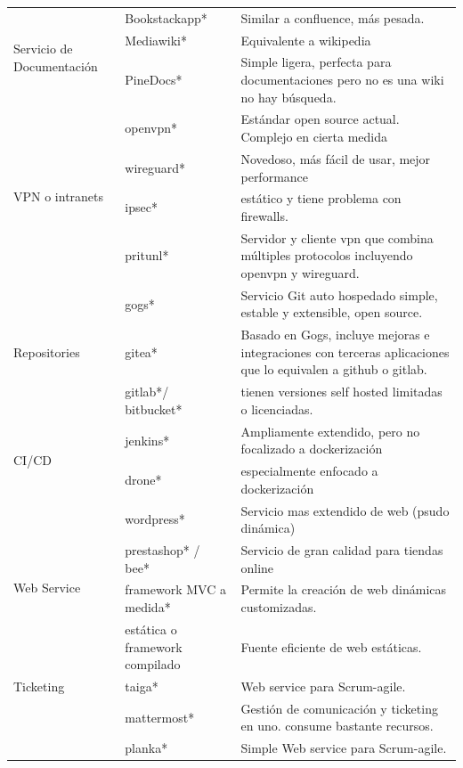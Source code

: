 \begin{center}
\begin{longtable}[!ht]{|p{3cm}|p{4cm}|p{6cm}|}
\multirow{3}{4em}{Servicio de Documentación} & Bookstackapp\cite{c_bookstack}* &  Similar a confluence, más pesada. \\ \cline{2-3} 
 & Mediawiki\cite{c_media_wiki}* &  Equivalente a wikipedia\\ \cline{2-3} 
 & PineDocs\cite{c_pinedocs}* &  Simple ligera, perfecta para documentaciones pero no es una wiki no hay búsqueda.\\ \hline
 
\multirow{4}{4em}{VPN o intranets} & openvpn\cite{c_openvpn}* & Estándar open source actual. Complejo en cierta medida \\ \cline{2-3} 
 & wireguard\cite{c_wireguard}* & Novedoso, más fácil de usar, mejor performance \\ \cline{2-3} 
 & ipsec\cite{c_ipsec}* & estático y tiene problema con firewalls. \\ \cline{2-3} 
 & pritunl\cite{c_pritunl}* & Servidor y cliente vpn que combina múltiples protocolos incluyendo openvpn y wireguard. \\ \hline

\multirow{3}{4em}{Repositories} & gogs\cite{c_gogs}* & Servicio Git auto hospedado simple, estable y extensible, open source. \\ \cline{2-3} 
 & gitea\cite{c_gitea}* & Basado en Gogs, incluye mejoras e integraciones con terceras aplicaciones que lo equivalen a github o gitlab. \\ \cline{2-3} 
 & gitlab\cite{c_gitlab}*/ bitbucket\cite{c_bitbucket}* & tienen versiones self hosted limitadas o licenciadas. \\ \hline

\multirow{2}{4em}{CI/CD} & jenkins\cite{c_jenkins}* &  Ampliamente extendido, pero no focalizado a dockerización\\ \cline{2-3} 
 & drone\cite{c_drone}* &  especialmente enfocado a dockerización\\ \hline
 
\multirow{4}{4em}{Web Service} & wordpress\cite{c_wordpress}* & Servicio mas extendido de web (psudo dinámica)\\ \cline{2-3} 
 & prestashop\cite{c_prestashop}* / bee\cite{c_bees}* & Servicio de gran calidad para tiendas online\\ \cline{2-3} 
 & framework MVC a medida* &  Permite la creación de web dinámicas customizadas.\\ \cline{2-3} 
 & estática o framework compilado\cite{c_hugo} &  Fuente eficiente de web estáticas.\\ \hline
Ticketing & taiga\cite{c_taiga}* &  Web service para Scrum-agile.\\ \hline
 & mattermost\cite{c_mattermost}* & Gestión de comunicación y ticketing en uno. consume bastante recursos.\\ \hline
 & planka\cite{c_planka}* &   Simple Web service para Scrum-agile.\\ \hline


\end{longtable}
\end{center}

